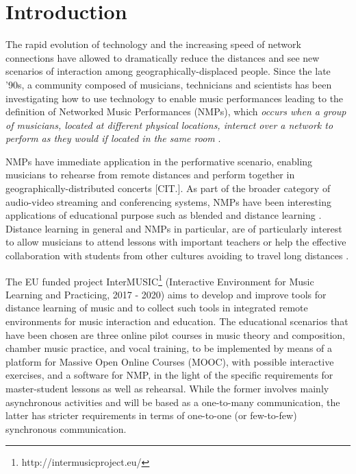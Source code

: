 
\section{Introduction}\label{sec:introduction}

The rapid evolution of technology and the increasing speed of network connections have allowed to dramatically reduce the distances and see new scenarios of interaction among geogra\-phically-displaced people. Since the late '90s, a community composed of musicians, technicians and  scientists has been investigating how to use technology to enable music performances leading to the definition of Networked Music Performances (NMPs), which \textit{occurs when a group of musicians, located at different physical locations, interact over a network to perform as they would if located in the same room} \cite{Lazzaro2001}.

NMPs have immediate application in the performative scenario, enabling musicians to rehearse from remote distances and perform together in geographically-distributed concerts [CIT.]. As part of the broader category of audio-video streaming and conferencing systems, NMPs have been interesting applications of educational purpose such as blended and distance learning \cite{IorwerthNMP2015}. Distance learning in general and NMPs in particular, are of particularly interest to allow musicians to attend lessons with important teachers or help the effective collaboration with students from other cultures avoiding to travel long distances \cite{IorwerthNMP2015}.


The EU funded project InterMUSIC\footnote{http://intermusicproject.eu/} (Interactive Environment for Music Learning and Practicing, 2017 - 2020) aims to develop and improve tools for distance learning of music and to collect such tools in integrated remote environments for music interaction and education. The educational scenarios that have been chosen are three online pilot courses in music theory and composition, chamber music practice, and vocal training, to be implemented by means of a platform for Massive Open Online Courses (MOOC), with possible interactive exercises, and a software for NMP, in the light of the specific requirements for master-student lessons as well as rehearsal. While the former involves mainly asynchronous activities and will be based as a one-to-many communication, the latter has stricter requirements in terms of one-to-one (or few-to-few) synchronous communication. 

